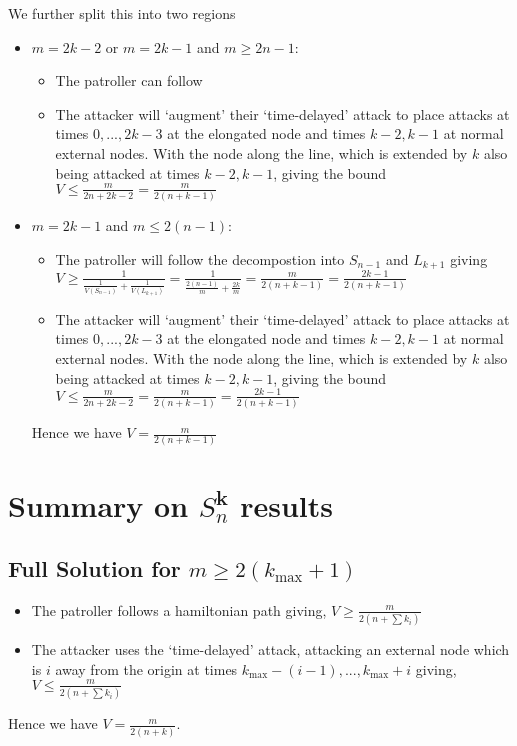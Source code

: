 \documentclass[a4paper,10pt]{article}
\theoremstyle{definition}
\theoremstyle{definition}
\theoremstyle{remark}
\theoremstyle{definition}
\begin{document}
We further split this into two regions

\begin{itemize}
\item $m=2k-2$ or $m=2k-1$ and $m \geq 2n-1$:

 \begin{itemize}
 \item The patroller can follow 


  \item The attacker will `augment' their `time-delayed' attack to place attacks at times $0,...,2k-3$ at the elongated node and times $k-2,k-1$ at normal external nodes. With the node along the line, which is extended by $k$ also being attacked at times $k-2,k-1$, giving the bound $V \leq \frac{m}{2n + 2k-2}=\frac{m}{2(n+k-1)}$
 \end{itemize}

\item $m=2k-1$ and $m \leq 2(n-1)$:

 \begin{itemize}
 \item The patroller will follow the decompostion into $S_{n-1}$ and $L_{k+1}$ giving $V \geq \frac{1}{\frac{1}{V(S_{n-1})}+\frac{1}{V(L_{k+1})}}=\frac{1}{\frac{2(n-1)}{m}+\frac{2k}{m}}=\frac{m}{2(n+k-1)}=\frac{2k-1}{2(n+k-1)}$
 \item The attacker will `augment' their `time-delayed' attack to place attacks at times $0,...,2k-3$ at the elongated node and times $k-2,k-1$ at normal external nodes. With the node along the line, which is extended by $k$ also being attacked at times $k-2,k-1$, giving the bound $V \leq \frac{m}{2n + 2k-2}=\frac{m}{2(n+k-1)}=\frac{2k-1}{2(n+k-1)}$
 \end{itemize}  
 Hence we have $V=\frac{m}{2(n+k-1)}$
 
\end{itemize}

\section[]{Summary on $S_{n}^{\bm{k}}$ results}

\subsection[]{Full Solution for $m \geq 2(k_{\max} +1)$}

\begin{itemize}
\item The patroller follows a hamiltonian path giving, $V \geq \frac{m}{2(n+\sum k_{i})}$
\item The attacker uses the `time-delayed' attack, attacking an external node which is $i$ away from the origin at times $k_{\max}-(i-1),...,k_{\max}+i$ giving, $V \leq \frac{m}{2(n+ \sum k_{i})}$
\end{itemize}
Hence we have $V= \frac{m}{2(n+k)}$.
\end{document}
